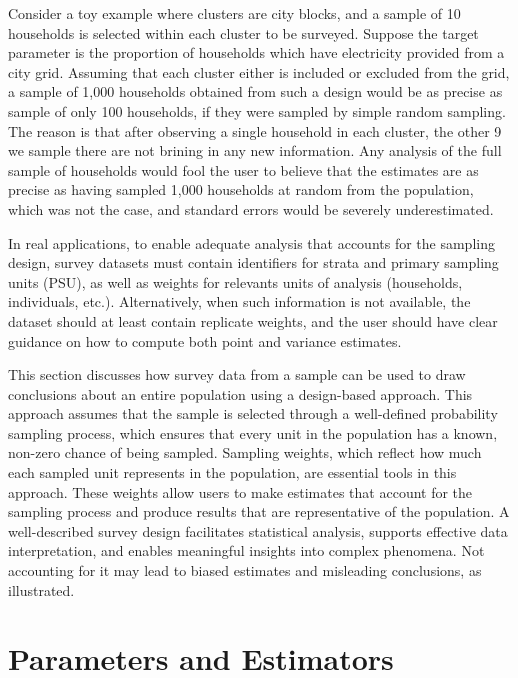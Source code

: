 \documentclass[
  12pt,
]{book}
\begin{document}
Consider a toy example where clusters are city blocks, and a sample of 10 households is selected within each cluster to be surveyed. Suppose the target parameter is the proportion of households which have electricity provided from a city grid. Assuming that each cluster either is included or excluded from the grid, a sample of 1,000 households obtained from such a design would be as precise as sample of only 100 households, if they were sampled by simple random sampling. The reason is that after observing a single household in each cluster, the other 9 we sample there are not brining in any new information. Any analysis of the full sample of households would fool the user to believe that the estimates are as precise as having sampled 1,000 households at random from the population, which was not the case, and standard errors would be severely underestimated.

In real applications, to enable adequate analysis that accounts for the sampling design, survey datasets must contain identifiers for strata and primary sampling units (PSU), as well as weights for relevants units of analysis (households, individuals, etc.). Alternatively, when such information is not available, the dataset should at least contain replicate weights, and the user should have clear guidance on how to compute both point and variance estimates.

This section discusses how survey data from a sample can be used to draw conclusions about an entire population using a design-based approach. This approach assumes that the sample is selected through a well-defined probability sampling process, which ensures that every unit in the population has a known, non-zero chance of being sampled. Sampling weights, which reflect how much each sampled unit represents in the population, are essential tools in this approach. These weights allow users to make estimates that account for the sampling process and produce results that are representative of the population. A well-described survey design facilitates statistical analysis, supports effective data interpretation, and enables meaningful insights into complex phenomena. Not accounting for it may lead to biased estimates and misleading conclusions, as illustrated.

\hypertarget{parameters-and-estimators}{%
\section{Parameters and Estimators}\label{parameters-and-estimators}}
\end{document}
